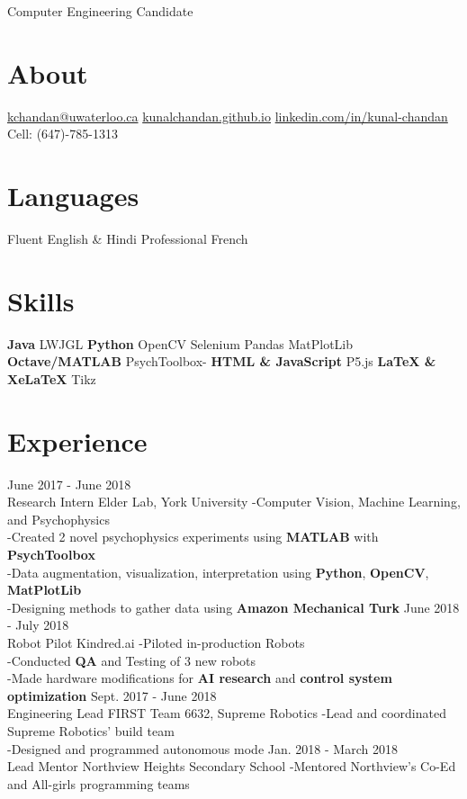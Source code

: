 \documentclass[]{chandan-cv}
\begin{document}
       {Computer Engineering Candidate}


\begin{aside}
  \section{About}
    \href{mailto:kchandan@uwaterloo.ca}{kchandan@uwaterloo.ca}
    \href{https://kunalchandan.github.io}{kunalchandan.github.io}
    \href{https://www.linkedin.com/in/kunal-chandan/}{linkedin.com/in/kunal-chandan}
    Cell: (647)-785-1313
  \section{Languages}
    Fluent English \& Hindi
    Professional French

  \section{Skills}
    \textbf{Java}
    LWJGL
\hfill
    \textbf{Python}
    OpenCV
    Selenium
    Pandas
    MatPlotLib
\hfill
    \textbf{Octave/MATLAB}
    PsychToolbox-
\hfill
    \textbf{HTML \& JavaScript}
    P5.js
\hfill
    \textbf{LaTeX \& XeLaTeX}
    Tikz
\end{aside}

\section{Experience}

\begin{entrylist}
  \entry
    {June 2017 - June 2018\\}
    {Research Intern}
    {Elder Lab, York University}
    {-Computer Vision, Machine Learning, and Psychophysics
	\\-Created 2 novel psychophysics experiments using \textbf{MATLAB} with \textbf{PsychToolbox}
	\\-Data augmentation, visualization, interpretation using \textbf{Python}, \textbf{OpenCV}, \textbf{MatPlotLib}
	\\-Designing methods to gather data using \textbf{Amazon Mechanical Turk}}
  \entry
    {June 2018 - July 2018\\}
    {Robot Pilot}
    {Kindred.ai}
    {-Piloted in-production Robots
	\\-Conducted \textbf{QA} and Testing of 3 new robots
	\\-Made hardware modifications for \textbf{AI research} and \textbf{control system optimization}}
  \entry
    {Sept. 2017 - June 2018\\}
    {Engineering Lead}
    {FIRST Team 6632, Supreme Robotics}
    {-Lead and coordinated Supreme Robotics' build team
	\\-Designed and programmed autonomous mode}
  \entry
    {Jan. 2018 - March 2018\\}
    {Lead Mentor}
    {Northview Heights Secondary School}
    {-Mentored Northview's Co-Ed and All-girls programming teams}
\end{entrylist}
\end{document}
